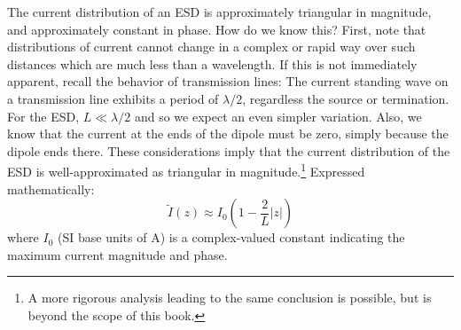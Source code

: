 The current distribution of an ESD is approximately triangular in magnitude, and approximately constant in phase. 
How do we know this?
First, note that distributions of current cannot change in a complex or rapid way over such distances which are much less than a wavelength.
If this is not immediately apparent, recall the behavior of transmission lines:  The current standing wave on a transmission line exhibits a period of $\lambda/2$, regardless the source or termination.
For the ESD, $L\ll\lambda/2$ and so we expect an even simpler variation.
Also, we know that the current at the ends of the dipole must be zero, simply because the dipole ends there.
These considerations imply that the current distribution of the ESD is well-approximated as triangular in magnitude.\footnote{A more rigorous analysis leading to the same conclusion is possible, but is beyond the scope of this book.}
Expressed mathematically:
%
\begin{equation}
\widetilde{I}(z) \approx I_0 \left(1-\frac{2}{L}\left|z\right|\right) 
\end{equation}
%
where $I_0$ (SI base units of A) is a complex-valued constant indicating the maximum current magnitude and phase.

